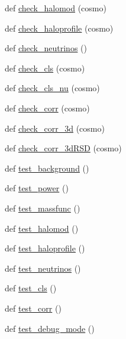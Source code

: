 \begin{DoxyCompactItemize}
def \mbox{\hyperlink{namespaceccl__test__pyccl__interface_a54fc00031b869f3aa6aa6f383d0aeec8}{check\+\_\+halomod}} (cosmo)
\item 
def \mbox{\hyperlink{namespaceccl__test__pyccl__interface_abe190d7efeea2a7b5c34ed0659a16c75}{check\+\_\+haloprofile}} (cosmo)
\item 
def \mbox{\hyperlink{namespaceccl__test__pyccl__interface_a45d1e6f91fd168f5b48149bfdfa6aa8b}{check\+\_\+neutrinos}} ()
\item 
def \mbox{\hyperlink{namespaceccl__test__pyccl__interface_a52b035753596952f1d3d265ad903dcb3}{check\+\_\+cls}} (cosmo)
\item 
def \mbox{\hyperlink{namespaceccl__test__pyccl__interface_a1e444dede41317aa26bcdc16c0eaeb53}{check\+\_\+cls\+\_\+nu}} (cosmo)
\item 
def \mbox{\hyperlink{namespaceccl__test__pyccl__interface_a3fae4f90be1642643dc2c746846a3e10}{check\+\_\+corr}} (cosmo)
\item 
def \mbox{\hyperlink{namespaceccl__test__pyccl__interface_a1ad832016b388d40507aac3844c14ec4}{check\+\_\+corr\+\_\+3d}} (cosmo)
\item 
def \mbox{\hyperlink{namespaceccl__test__pyccl__interface_aa8e3694e3fffe81ea6217b51f7d6cec5}{check\+\_\+corr\+\_\+3d\+R\+SD}} (cosmo)
\item 
def \mbox{\hyperlink{namespaceccl__test__pyccl__interface_ac8e0f5304f7823f08dd48bd16736cbde}{test\+\_\+background}} ()
\item 
def \mbox{\hyperlink{namespaceccl__test__pyccl__interface_aa0fa1e5e5f099cfa4e0c55e8cc80f585}{test\+\_\+power}} ()
\item 
def \mbox{\hyperlink{namespaceccl__test__pyccl__interface_a7aa32506e6319a810450e886106d3207}{test\+\_\+massfunc}} ()
\item 
def \mbox{\hyperlink{namespaceccl__test__pyccl__interface_a1936b759676e55f5a5c9a339af0bba48}{test\+\_\+halomod}} ()
\item 
def \mbox{\hyperlink{namespaceccl__test__pyccl__interface_a32790ac592e2c16a4bda518f9c026137}{test\+\_\+haloprofile}} ()
\item 
def \mbox{\hyperlink{namespaceccl__test__pyccl__interface_ae4c580c07c1b1ff62524d160ea8d6756}{test\+\_\+neutrinos}} ()
\item 
def \mbox{\hyperlink{namespaceccl__test__pyccl__interface_af43480922699de3f04ac202305e22666}{test\+\_\+cls}} ()
\item 
def \mbox{\hyperlink{namespaceccl__test__pyccl__interface_ac7244d534c03943f2b622f66d8b5e431}{test\+\_\+corr}} ()
\item 
def \mbox{\hyperlink{namespaceccl__test__pyccl__interface_aefa58335e41682f374a241db87d26278}{test\+\_\+debug\+\_\+mode}} ()
\end{DoxyCompactItemize}


